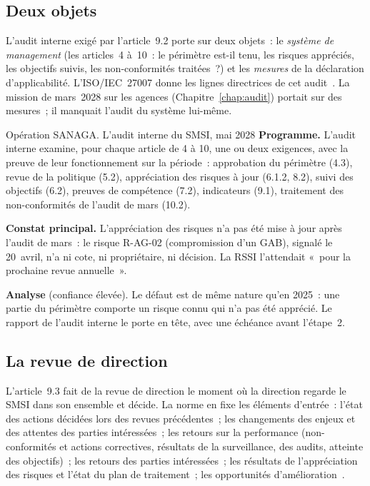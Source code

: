 \subsection{Deux objets}

L'audit interne exigé par l'article~9.2 porte sur deux objets~: le
\emph{système de management} (les articles~4 à~10~: le périmètre est-il
tenu, les risques appréciés, les objectifs suivis, les non-conformités
traitées~?) et les \emph{mesures} de la déclaration d'applicabilité.
L'ISO/IEC~27007 donne les lignes directrices de cet audit~\cite{iso27007_2020}.
La mission de mars~2028 sur les agences (Chapitre~\ref{chap:audit}) portait
sur des mesures~; il manquait l'audit du système lui-même.

\begin{boxscenario}{Opération SANAGA. L'audit interne du SMSI, mai 2028}
\textbf{Programme.} L'audit interne examine, pour chaque article de 4 à 10,
une ou deux exigences, avec la preuve de leur fonctionnement sur la
période~: approbation du périmètre (4.3), revue de la politique (5.2),
appréciation des risques à jour (6.1.2, 8.2), suivi des objectifs (6.2),
preuves de compétence (7.2), indicateurs (9.1), traitement des
non-conformités de l'audit de mars (10.2).

\medskip
\textbf{Constat principal.} L'appréciation des risques n'a pas été mise à
jour après l'audit de mars~: le risque R-AG-02 (compromission d'un GAB),
signalé le 20~avril, n'a ni cote, ni propriétaire, ni décision. La RSSI
l'attendait «~pour la prochaine revue annuelle~».

\medskip
\textbf{Analyse} (confiance élevée). Le défaut est de même nature qu'en
2025~: une partie du périmètre comporte un risque connu qui n'a pas été
apprécié. Le rapport de l'audit interne le porte en tête, avec une
échéance avant l'étape~2.
\end{boxscenario}

\subsection{La revue de direction}

L'article~9.3 fait de la revue de direction le moment où la direction
regarde le SMSI dans son ensemble et décide. La norme en fixe les éléments
d'entrée~: l'état des actions décidées lors des revues précédentes~; les
changements des enjeux et des attentes des parties intéressées~; les
retours sur la performance (non-conformités et actions correctives,
résultats de la surveillance, des audits, atteinte des objectifs)~; les
retours des parties intéressées~; les résultats de l'appréciation des
risques et l'état du plan de traitement~; les opportunités
d'amélioration~\cite{iso27001_2022}.

